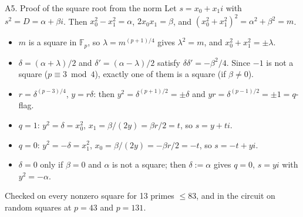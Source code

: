 \documentclass[aspectratio=169,10pt]{beamer}
\begin{document}
\begin{frame}{A5. Proof of the square root from the norm}
\small
Let $s=x_0+x_1i$ with $s^2=D=\alpha+\beta i$. Then $x_0^2-x_1^2=\alpha$, $2x_0x_1=\beta$, and $(x_0^2+x_1^2)^2=\alpha^2+\beta^2=m$.
\begin{itemize}
\item $m$ is a square in $\mathbb F_p$, so $\lambda=m^{(p+1)/4}$ gives $\lambda^2=m$, and $x_0^2+x_1^2=\pm\lambda$.
\item $\delta=(\alpha+\lambda)/2$ and $\delta'=(\alpha-\lambda)/2$ satisfy $\delta\delta'=-\beta^2/4$. Since $-1$ is not a square ($p\equiv3\bmod4$), exactly one of them is a square (if $\beta\ne0$).
\item $r=\delta^{(p-3)/4}$, $y=r\delta$: then $y^2=\delta^{(p+1)/2}=\pm\delta$ and $yr=\delta^{(p-1)/2}=\pm1=q$-flag.
\item $q=1$: $y^2=\delta=x_0^2$, $x_1=\beta/(2y)=\beta r/2=t$, so $s=y+ti$.
\item $q=0$: $y^2=-\delta=x_1^2$, $x_0=\beta/(2y)=-\beta r/2=-t$, so $s=-t+yi$.
\item $\delta=0$ only if $\beta=0$ and $\alpha$ is not a square; then $\delta:=\alpha$ gives $q=0$, $s=yi$ with $y^2=-\alpha$.
\end{itemize}
Checked on every nonzero square for 13 primes $\le83$, and in the circuit on random squares at $p=43$ and $p=131$.
\end{frame}
\end{document}
